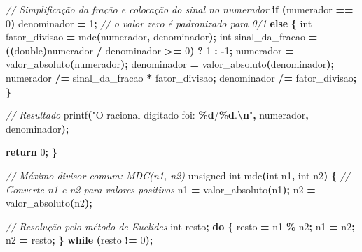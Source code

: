 \documentclass[
  11pt,
  a4paper,
]{scrbook}
\newenvironment{Shaded}{\begin{snugshade}}{\end{snugshade}}
\newcommand{\CommentTok}[1]{\textcolor[rgb]{0.56,0.35,0.01}{\textit{#1}}}
\newcommand{\ControlFlowTok}[1]{\textcolor[rgb]{0.13,0.29,0.53}{\textbf{#1}}}
\newcommand{\DataTypeTok}[1]{\textcolor[rgb]{0.13,0.29,0.53}{#1}}
\newcommand{\DecValTok}[1]{\textcolor[rgb]{0.00,0.00,0.81}{#1}}
\newcommand{\NormalTok}[1]{#1}
\newcommand{\OperatorTok}[1]{\textcolor[rgb]{0.81,0.36,0.00}{\textbf{#1}}}
\newcommand{\SpecialCharTok}[1]{\textcolor[rgb]{0.81,0.36,0.00}{\textbf{#1}}}
\newcommand{\StringTok}[1]{\textcolor[rgb]{0.31,0.60,0.02}{#1}}
\begin{document}
\begin{Shaded}
\begin{Highlighting}[numbers=left,,]
    \CommentTok{// Simplificação da fração e colocação do sinal no numerador}
    \ControlFlowTok{if} \OperatorTok{(}\NormalTok{numerador }\OperatorTok{==} \DecValTok{0}\OperatorTok{)}
\NormalTok{        denominador }\OperatorTok{=} \DecValTok{1}\OperatorTok{;}  \CommentTok{// o valor zero é padronizado para 0/1}
    \ControlFlowTok{else} \OperatorTok{\{}
        \DataTypeTok{int}\NormalTok{ fator\_divisao }\OperatorTok{=}\NormalTok{ mdc}\OperatorTok{(}\NormalTok{numerador}\OperatorTok{,}\NormalTok{ denominador}\OperatorTok{);}
        \DataTypeTok{int}\NormalTok{ sinal\_da\_fracao }\OperatorTok{=} \OperatorTok{((}\DataTypeTok{double}\OperatorTok{)}\NormalTok{numerador }\OperatorTok{/}\NormalTok{ denominador }\OperatorTok{\textgreater{}=} \DecValTok{0}\OperatorTok{)} \OperatorTok{?} \DecValTok{1} \OperatorTok{:} \OperatorTok{{-}}\DecValTok{1}\OperatorTok{;}
\NormalTok{        numerador }\OperatorTok{=}\NormalTok{ valor\_absoluto}\OperatorTok{(}\NormalTok{numerador}\OperatorTok{);}
\NormalTok{        denominador }\OperatorTok{=}\NormalTok{ valor\_absoluto}\OperatorTok{(}\NormalTok{denominador}\OperatorTok{);}
\NormalTok{        numerador }\OperatorTok{/=}\NormalTok{ sinal\_da\_fracao }\OperatorTok{*}\NormalTok{ fator\_divisao}\OperatorTok{;}
\NormalTok{        denominador }\OperatorTok{/=}\NormalTok{ fator\_divisao}\OperatorTok{;}
    \OperatorTok{\}}

    \CommentTok{// Resultado}
\NormalTok{    printf}\OperatorTok{(}\StringTok{"O racional digitado foi: }\SpecialCharTok{\%d}\StringTok{/}\SpecialCharTok{\%d}\StringTok{.}\SpecialCharTok{\textbackslash{}n}\StringTok{"}\OperatorTok{,}\NormalTok{ numerador}\OperatorTok{,}\NormalTok{ denominador}\OperatorTok{);}

    \ControlFlowTok{return} \DecValTok{0}\OperatorTok{;}
\OperatorTok{\}}

\CommentTok{// Máximo divisor comum: MDC(n1, n2)}
\DataTypeTok{unsigned} \DataTypeTok{int}\NormalTok{ mdc}\OperatorTok{(}\DataTypeTok{int}\NormalTok{ n1}\OperatorTok{,} \DataTypeTok{int}\NormalTok{ n2}\OperatorTok{)} \OperatorTok{\{}
    \CommentTok{// Converte n1 e n2 para valores positivos}
\NormalTok{    n1 }\OperatorTok{=}\NormalTok{ valor\_absoluto}\OperatorTok{(}\NormalTok{n1}\OperatorTok{);}
\NormalTok{    n2 }\OperatorTok{=}\NormalTok{ valor\_absoluto}\OperatorTok{(}\NormalTok{n2}\OperatorTok{);}

    \CommentTok{// Resolução pelo método de Euclides}
    \DataTypeTok{int}\NormalTok{ resto}\OperatorTok{;}
    \ControlFlowTok{do} \OperatorTok{\{}
\NormalTok{        resto }\OperatorTok{=}\NormalTok{ n1 }\OperatorTok{\%}\NormalTok{ n2}\OperatorTok{;}
\NormalTok{        n1 }\OperatorTok{=}\NormalTok{ n2}\OperatorTok{;}
\NormalTok{        n2 }\OperatorTok{=}\NormalTok{ resto}\OperatorTok{;}
    \OperatorTok{\}} \ControlFlowTok{while} \OperatorTok{(}\NormalTok{resto }\OperatorTok{!=} \DecValTok{0}\OperatorTok{);}


\end{Highlighting}
\end{Shaded}
\end{document}
